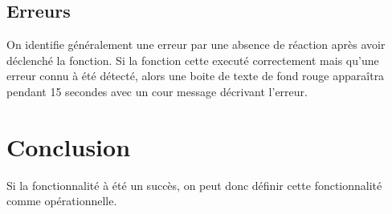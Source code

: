 \documentclass[10pt,a4paper,onecolumn]{article}
\begin{document}
\subsection{Erreurs}
On identifie généralement une erreur par une absence de réaction après avoir déclenché la fonction. Si la fonction cette executé correctement mais qu'une erreur connu à été détecté, alors une boite de texte de fond rouge apparaîtra pendant 15 secondes avec un cour message décrivant l'erreur.
\section{Conclusion}
Si la fonctionnalité à été un succès, on peut donc définir cette fonctionnalité comme opérationnelle. 
\end{document}
